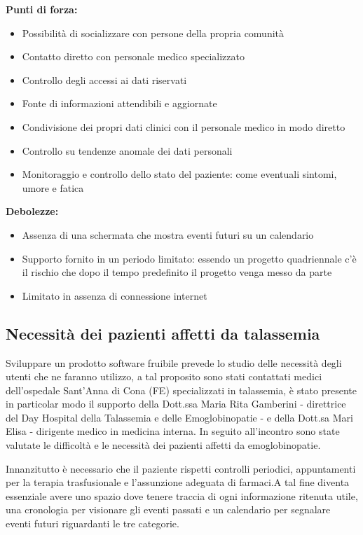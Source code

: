 \documentclass[12pt,a4paper,openright,twoside]{report}
\begin{document}
\textbf{Punti di forza:}
\begin{itemize}
    \item Possibilità di socializzare con persone della propria comunità
    \item Contatto diretto con personale medico specializzato
    \item Controllo degli accessi ai dati riservati
    \item Fonte di informazioni attendibili e aggiornate
    \item Condivisione dei propri dati clinici con il personale medico in modo diretto
    \item Controllo su tendenze anomale dei dati personali
    \item Monitoraggio e controllo dello stato del paziente: come eventuali sintomi, umore e fatica
\end{itemize}

\textbf{Debolezze:}
\begin{itemize}
    \item Assenza di una schermata che mostra eventi futuri su un calendario
    \item Supporto fornito in un periodo limitato: essendo un progetto quadriennale c'è il rischio che dopo il tempo predefinito il progetto venga messo da parte
    \item Limitato in assenza di connessione internet 
\end{itemize}


\subsection{Necessità dei pazienti affetti da talassemia}
Sviluppare un prodotto software fruibile prevede lo studio delle necessità degli utenti che ne faranno utilizzo, a tal proposito sono stati contattati medici dell'ospedale Sant'Anna di Cona (FE) specializzati in talassemia, è stato presente in particolar modo il supporto della Dott.ssa Maria Rita Gamberini - direttrice del Day Hospital della Talassemia e delle Emoglobinopatie - e della Dott.sa Mari Elisa - dirigente medico in medicina interna. 
In seguito all'incontro sono state valutate le difficoltà e le necessità dei pazienti affetti da emoglobinopatie.

Innanzitutto è necessario che il paziente rispetti controlli periodici, appuntamenti per la terapia trasfusionale e l'assunzione adeguata di farmaci.A tal fine diventa essenziale avere uno spazio dove tenere traccia di ogni informazione ritenuta utile, una cronologia per visionare gli eventi passati e un calendario per segnalare eventi futuri riguardanti le tre categorie. 
\end{document}
